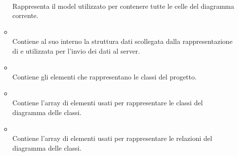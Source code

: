 \begin{itemize}
\begin{itemize}
\\ Rappresenta il model utilizzato per contenere tutte le celle del diagramma corrente.
\item {}
\\ Contiene al suo interno la struttura dati scollegata dalla rappresentazione di \jointjs{} e utilizzata per l'invio dei dati al server.
\item {}
\\ Contiene gli elementi che rappresentano le classi del progetto.
\item {}
\\ Contiene l'array di elementi usati per rappresentare le classi del diagramma delle classi.
\item {}
\\ Contiene l'array di elementi usati per rappresentare le relazioni del diagramma delle classi.	


\end{itemize}
\end{itemize}
